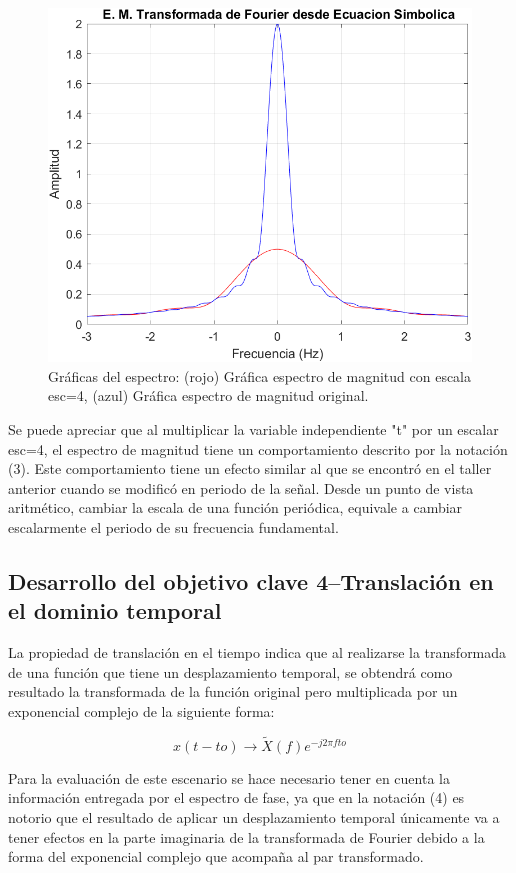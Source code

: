 \documentclass[11pt,letterpaper,twocolumn]{article}
\begin{document}
            \begin{figure}[H]
                \centering 
                    \includegraphics[width=0.5\linewidth]{img/Propescala.png}
                \caption{Gráficas del espectro: (rojo) Gráfica 
                        espectro de magnitud con escala esc=4, (azul) Gráfica espectro de magnitud original.}
                \label{P1}
            \end{figure}
            
        Se puede apreciar que al multiplicar la variable independiente "t" por un escalar esc=4, el espectro de magnitud tiene un comportamiento descrito por la notación (3). Este comportamiento tiene un efecto similar al que se encontró en el taller anterior cuando se modificó en periodo de la señal. Desde un punto de vista aritmético, cambiar la escala de una función periódica, equivale a cambiar escalarmente el periodo de su frecuencia fundamental.
        
    \subsection{Desarrollo del objetivo clave 4--Translación en el dominio temporal}
        La propiedad de translación en el tiempo indica que al realizarse la transformada de una función que tiene un desplazamiento temporal, se obtendrá como resultado la transformada de la función original pero multiplicada por un exponencial complejo de la siguiente forma: 
        
        \begin{equation}
            {x}(t-to) \rightarrow \tilde{X}(f) e^{-j2 \pi fto}
            \label{TTiempo}
        \end{equation}
        
        Para la evaluación de este escenario se hace necesario tener en cuenta la información entregada por el espectro de fase, ya que en la notación (4) es notorio que el resultado de aplicar un desplazamiento temporal únicamente va a tener efectos en la parte imaginaria de la transformada de Fourier debido a la forma del exponencial complejo que acompaña al par transformado.
        
\end{document}
